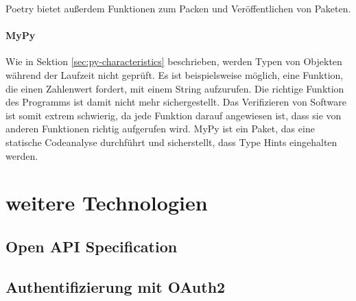 		Poetry bietet außerdem Funktionen zum Packen und Veröffentlichen von Paketen.
		\paragraph{MyPy} Wie in Sektion \ref{sec:py-characteristics} beschrieben, werden Typen von Objekten während der Laufzeit nicht geprüft. Es ist beispielsweise möglich, eine Funktion, die einen Zahlenwert fordert, mit einem String aufzurufen. Die richtige Funktion des Programms ist damit nicht mehr sichergestellt. Das Verifizieren von Software ist somit extrem schwierig, da jede Funktion darauf angewiesen ist, dass sie von anderen Funktionen richtig aufgerufen wird. MyPy ist ein Paket, das eine statische Codeanalyse durchführt und sicherstellt, dass Type Hints eingehalten werden.
		
	
\section{weitere Technologien}
	\subsection{Open API Specification}
	\subsection{Authentifizierung mit OAuth2}
	